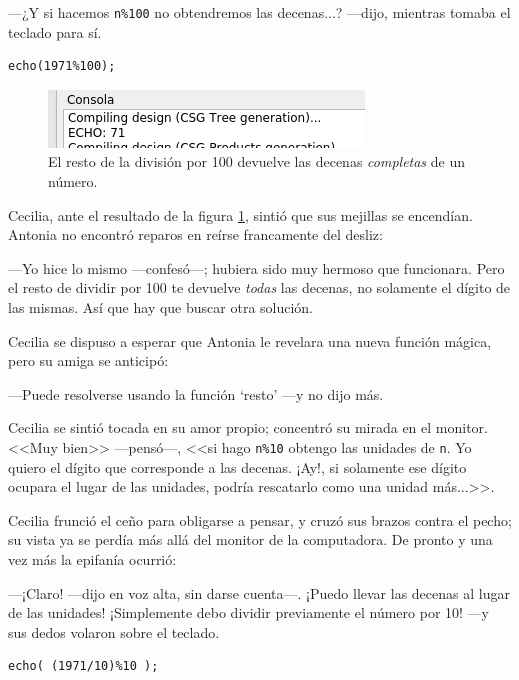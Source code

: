 ---¿Y si hacemos \lstinline!n%100! no obtendremos las decenas...?
---dijo, mientras tomaba el teclado para sí.


\begin{lstlisting}[numbers=none]
echo(1971%100);
\end{lstlisting}

\begin{figure}[ht]
  \centering
\includegraphics[width=.75\textwidth]{imagenes/resto-100}  
\caption{El resto de la división por 100 devuelve las decenas
  \emph{completas} de un número.}
  \label{fig:resto-100}
\end{figure}


Cecilia, ante el resultado de la figura \ref{fig:resto-100}, sintió
que sus mejillas se encendían. Antonia no encontró reparos en reírse
francamente del desliz:

---Yo hice lo mismo ---confesó---; hubiera sido muy hermoso que
funcionara. Pero el resto de dividir por 100 te devuelve \emph{todas}
las decenas, no solamente el dígito de las mismas. Así que hay que
buscar otra solución.

Cecilia se dispuso a esperar que Antonia le revelara una nueva función
mágica, pero su amiga se anticipó:

---Puede resolverse usando la función `resto' ---y no dijo más.

Cecilia se sintió tocada en su amor propio; concentró su mirada en el
monitor. <<Muy bien>> ---pensó---, <<si hago \lstinline!n%10! obtengo
las unidades de \lstinline!n!. Yo quiero el dígito que corresponde a
las decenas. ¡Ay!, si solamente ese dígito ocupara el lugar de las
unidades, podría rescatarlo como una unidad más...>>.

Cecilia frunció el ceño para obligarse a pensar, y cruzó sus brazos
contra el pecho; su vista ya se perdía más allá del monitor de la
computadora. De pronto y una vez más la epifanía ocurrió:

---¡Claro! ---dijo en voz alta, sin darse cuenta---.  ¡Puedo llevar
las decenas al lugar de las unidades!  ¡Simplemente debo dividir
previamente el número por 10! ---y sus dedos volaron sobre el teclado.

\begin{lstlisting}[numbers=none]
echo( (1971/10)%10 );
\end{lstlisting}

